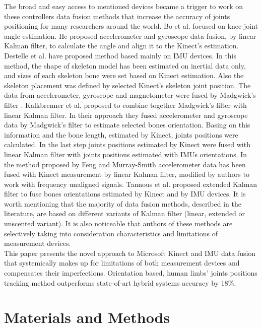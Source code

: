 \documentclass[sensors,article,submit,moreauthors,pdftex,10pt,a4paper]{mdpi}
\begin{document}
The broad and easy access to mentioned devices became a trigger to work on these controllers data fusion methods that increase the accuracy of joints positioning for many researchers around the world. Bo et al. \cite{Bo2011a} focused on knee joint angle estimation. He proposed accelerometer and gyroscope data fusion, by linear Kalman filter, to calculate the angle and align it to the Kinect’s estimation. Destelle et al. \cite{Destelle2014} have proposed method based mainly on IMU devices. In this method, the shape of skeleton model has been estimated on inertial data only, and sizes of each skeleton bone were set based on Kinect estimation. Also the skeleton placement was defined by selected Kinect’s skeleton joint position. The data from accelerometer, gyroscope and magnetometer were fused by Madgwick’s filter \cite{Madgwick2011}. Kalkbrenner et al. \cite{Kalkbrenner2014} proposed to combine together Madgwick’s filter with linear Kalman filter. In their approach they fused accelerometer and gyroscope data by Madgwick’s filter to estimate selected bones orientation. Basing on this information and the bone length, estimated by Kinect, joints positions were calculated. In the last step joints positions estimated by Kinect were fused with linear Kalman filter with joints positions estimated with IMUs orientations. In the method proposed by Feng and Murray-Smith \cite{Murray-Smith2014} accelerometer data has been fused with Kinect measurement by linear Kalman filter, modified by authors to work with frequency unaligned signals. Tannous et al. \cite{Tannous2016} proposed extended Kalman filter to fuse bones orientations estimated by Kinect and by IMU devices. It is worth mentioning that the majority of data fusion methods, described in the literature, are based on different variants of Kalman filter (linear, extended or unscented variant). It is also noticeable that authors of these methods are selectively taking into consideration characteristics and limitations of measurement devices. \\
This paper presents the novel approach to Microsoft Kinect and IMU data fusion that systemically makes up for limitations of both measurement devices and compensates their imperfections. Orientation based, human limbs’ joints positions tracking method outperforms state-of-art hybrid systems accuracy by 18\%.

\section{Materials and Methods}
\end{document}
